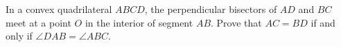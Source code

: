 In a convex quadrilateral $ABCD$, the perpendicular bisectors of $AD$ and $BC$ meet at a point $O$ in the interior of segment $AB$. Prove that $AC=BD$ if and only if $\angle DAB=\angle ABC$.
